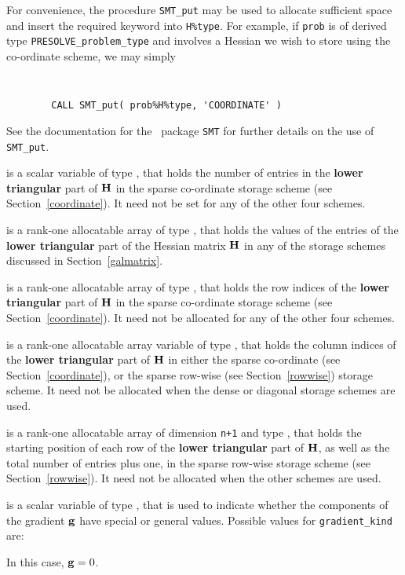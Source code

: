 \documentclass{galahad}
\newcommand{\packagename}{PRESOLVE}
\begin{document}
\begin{description}
\begin{description}
For convenience, the procedure {\tt SMT\_put}
may be used to allocate sufficient space and insert the required keyword
into {\tt H\%type}.
For example, if {\tt prob} is of derived type {\tt \packagename\_problem\_type}
and involves a Hessian we wish to store using the co-ordinate scheme,
we may simply
{\tt
\begin{verbatim}
        CALL SMT_put( prob%H%type, 'COORDINATE' )
\end{verbatim}
}
\noindent
See the documentation for the \galahad\ package {\tt SMT}
for further details on the use of {\tt SMT\_put}.

 is a scalar variable of type \integer, that
holds the number of entries in the {\bf lower triangular} part of ${\mathbf{H}}$
in the sparse co-ordinate storage scheme (see Section~\ref{coordinate}).
It need not be set for any of the other four schemes.

 is a rank-one allocatable array of type \realdp, that holds
the values of the entries of the {\bf lower triangular} part
of the Hessian matrix ${\mathbf{H}}$ in any of the
storage schemes discussed in Section~\ref{galmatrix}.

 is a rank-one allocatable array of type \integer,
that holds the row indices of the {\bf lower triangular} part of ${\mathbf{H}}$
in the sparse co-ordinate storage
scheme (see Section~\ref{coordinate}).
It need not be allocated for any of the other four schemes.

 is a rank-one allocatable array variable of type \integer,
that holds the column indices of the {\bf lower triangular} part of
${\mathbf{H}}$ in either the sparse co-ordinate
(see Section~\ref{coordinate}), or the sparse row-wise
(see Section~\ref{rowwise}) storage scheme.
It need not be allocated when the dense or diagonal storage schemes are used.

 is a rank-one allocatable array of dimension {\tt n+1} and type
\integer, that holds the starting position of
each row of the {\bf lower triangular} part of ${\mathbf{H}}$, as well
as the total number of entries plus one, in the sparse row-wise storage
scheme (see Section~\ref{rowwise}). It need not be allocated when the
other schemes are used.

\end{description}

 is a scalar variable of type \integer,
that is used to indicate whether the components of the gradient ${\mathbf{g}}$
have special or general values. Possible values for {\tt gradient\_kind} are:
\begin{description}
  In this case, ${\mathbf{g}} = 0$.


\end{description}
\end{description}
\end{document}
